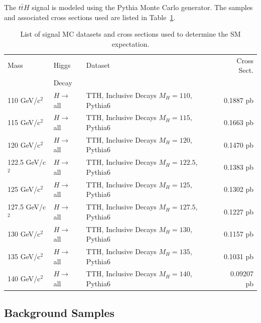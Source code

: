\par The $t\bar{t}H$ signal is modeled using the {\sc Pythia} Monte Carlo
generator.  The samples and associated cross sections used are listed in Table~\ref{tab:sigSamples}.

\begin{table}[hbtp]\footnotesize
\centering
\begin{tabular}{|l|p{}|p{}|r|}  
\hline\hline
Mass & Higgs & Dataset & Cross Sect. \\
& Decay & & \\
\hline
110 GeV/c$^2$ & $H\rightarrow$ all & TTH, Inclusive Decays
                                     $M_{H}=110$, Pythia6 & 0.1887 pb \\
\hline
115 GeV/c$^2$ & $H\rightarrow$ all & TTH, Inclusive Decays
                                     $M_{H}=115$, Pythia6 & 0.1663 pb \\
\hline
120 GeV/c$^2$ & $H\rightarrow$ all & TTH, Inclusive Decays
                                     $M_{H}=120$, Pythia6 & 0.1470 pb \\
\hline
122.5 GeV/c$^2$ & $H\rightarrow$ all & TTH, Inclusive Decays
                                     $M_{H}=122.5$, Pythia6 & 0.1383 pb \\
\hline
125 GeV/c$^2$ & $H\rightarrow$ all & TTH, Inclusive Decays
                                     $M_{H}=125$, Pythia6 & 0.1302 pb \\
\hline
127.5 GeV/c$^2$ & $H\rightarrow$ all & TTH, Inclusive Decays
                                     $M_{H}=127.5$, Pythia6 & 0.1227 pb \\
\hline
130 GeV/c$^2$ & $H\rightarrow$ all & TTH, Inclusive Decays
                                     $M_{H}=130$, Pythia6 & 0.1157 pb \\
\hline
135 GeV/c$^2$ & $H\rightarrow$ all & TTH, Inclusive Decays
                                     $M_{H}=135$, Pythia6 & 0.1031 pb \\
\hline
140 GeV/c$^2$ & $H\rightarrow$ all & TTH, Inclusive Decays
                                     $M_{H}=140$, Pythia6 & 0.09207 pb \\
\hline\hline
\end{tabular}
\caption{List of signal MC datasets and cross sections used to determine the SM expectation.}
\label{tab:sigSamples}
\end{table}


\subsection{Background Samples}
\label{background_sample_II_overview}

